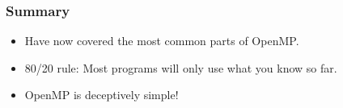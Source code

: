\documentclass{beamer}
\begin{document}
%
\begin{frame}
\frametitle{Summary}
\begin{itemize}
  \item Have now covered the most common parts of OpenMP.
  \item 80/20 rule: Most programs will only use what you know so far.
  \item OpenMP is deceptively simple!
\end{itemize}
\end{frame}

\end{document}
